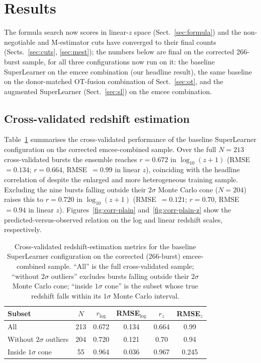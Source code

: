 \documentclass{aa}
\newcommand{\logz}{\log_{10}(z+1)}
\begin{document}
\section{Results}
\label{sec:results}

The formula search now scores in linear-$z$ space (Sect.~\ref{sec:formula}) and the
non-negotiable and M-estimator cuts have converged to their final counts
(Sects.~\ref{sec:cuts}, \ref{sec:mest}); the numbers below are final on the
corrected 266-burst sample, for all three configurations now run on it: the
baseline SuperLearner on the emcee combination (our headline result), the same
baseline on the donor-matched OT-fusion combination of Sect.~\ref{sec:ot}, and
the augmented SuperLearner (Sect.~\ref{sec:sl}) on the emcee combination.

\subsection{Cross-validated redshift estimation}
\label{sec:res-cv}

Table~\ref{tab:cv} summarises the cross-validated performance of the baseline
SuperLearner configuration on the corrected emcee-combined sample. Over the full
$N=213$ cross-validated bursts the ensemble reaches $r=0.672$ in $\logz$
(RMSE~$=0.134$; $r=0.664$, RMSE~$=0.99$ in linear $z$), coinciding with the headline
correlation of \citet{narendra2025} despite the enlarged and more heterogeneous
training sample. Excluding the nine bursts falling outside their $2\sigma$ Monte
Carlo cone ($N=204$) raises this to $r=0.720$ in $\logz$ (RMSE~$=0.121$; $r=0.70$,
RMSE~$=0.94$ in linear $z$). Figures~\ref{fig:corr-plain} and~\ref{fig:corr-plain-z}
show the predicted-versus-observed relation on the log and linear redshift scales,
respectively.

\begin{table}
  \centering
  \caption{Cross-validated redshift-estimation metrics for the baseline SuperLearner
    configuration on the corrected (266-burst) emcee-combined sample. ``All'' is
    the full cross-validated sample; ``without $2\sigma$ outliers'' excludes bursts
    falling outside their $2\sigma$ Monte Carlo cone; ``inside $1\sigma$ cone'' is
    the subset whose true redshift falls within its $1\sigma$ Monte Carlo interval.}
  \label{tab:cv}
  \begin{tabular}{lccccc}
    \hline\hline
    Subset & $N$ & $r_{\log}$ & RMSE$_{\log}$ & $r_z$ & RMSE$_z$ \\
    \hline
    All                       & 213 & 0.672 & 0.134 & 0.664 & 0.99  \\
    Without $2\sigma$ outliers & 204 & 0.720 & 0.121 & 0.70  & 0.94  \\
    Inside $1\sigma$ cone      & 55  & 0.964 & 0.036 & 0.967 & 0.245 \\
    \hline
  \end{tabular}
\end{table}
\end{document}
